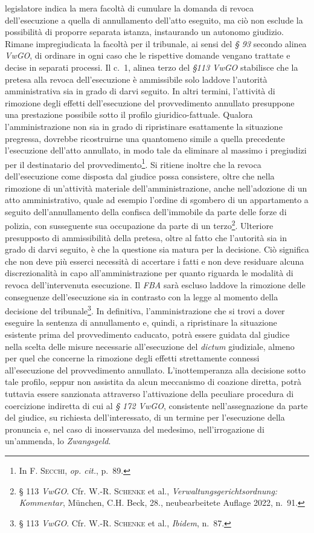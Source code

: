 \documentclass[12pt,it,a4paper,]{report}
\begin{document}
legislatore indica la mera facoltà di cumulare la domanda di revoca
dell'esecuzione a quella di annullamento dell'atto eseguito, ma ciò non
esclude la possibilità di proporre separata istanza, instaurando un
autonomo giudizio. Rimane impregiudicata la facoltà per il tribunale, ai
sensi del \emph{§ 93} secondo alinea \emph{VwGO}, di ordinare in ogni
caso che le rispettive domande vengano trattate e decise in separati
processi. Il c.~1, alinea terzo del \emph{§113 VwGO} stabilisce che la
pretesa alla revoca dell'esecuzione è ammissibile solo laddove
l'autorità amministrativa sia in grado di darvi seguito. In altri
termini, l'attività di rimozione degli effetti dell'esecuzione del
provvedimento annullato presuppone una prestazione possibile sotto il
profilo giuridico-fattuale. Qualora l'amministrazione non sia in grado
di ripristinare esattamente la situazione pregressa, dovrebbe
ricostruirne una quantomeno simile a quella precedente l'esecuzione
dell'atto annullato, in modo tale da eliminare al massimo i pregiudizi
per il destinatario del provvedimento\footnote{In \textsc{F. Secchi},
  \emph{op. cit.}, p.~89.}. Si ritiene inoltre che la revoca
dell'esecuzione come disposta dal giudice possa consistere, oltre che
nella rimozione di un'attività materiale dell'amministrazione, anche
nell'adozione di un atto amministrativo, quale ad esempio l'ordine di
sgombero di un appartamento a seguito dell'annullamento della confisca
dell'immobile da parte delle forze di polizia, con susseguente sua
occupazione da parte di un terzo\footnote{§ 113 \emph{VwGO}. Cfr. W.-R.
  \textsc{Schenke} et al., \emph{Verwaltungsgerichtsordnung: Kommentar},
  München, C.H. Beck, 28., neubearbeitete Auflage 2022, n.~91.}.
Ulteriore presupposto di ammissibilità della pretesa, oltre al fatto che
l'autorità sia in grado di darvi seguito, è che la questione sia matura
per la decisione. Ciò significa che non deve più esserci necessità di
accertare i fatti e non deve residuare alcuna discrezionalità in capo
all'amministrazione per quanto riguarda le modalità di revoca
dell'intervenuta esecuzione. Il \emph{FBA} sarà escluso laddove la
rimozione delle conseguenze dell'esecuzione sia in contrasto con la
legge al momento della decisione del tribunale\footnote{§ 113
  \emph{VwGO}. Cfr. W.-R. \textsc{Schenke} et al., \emph{Ibidem}, n.~87.}.
In definitiva, l'amministrazione che si trovi a dover eseguire la
sentenza di annullamento e, quindi, a ripristinare la situazione
esistente prima del provvedimento caducato, potrà essere guidata dal
giudice nella scelta delle misure necessarie all'esecuzione del
\emph{dictum} giudiziale, almeno per quel che concerne la rimozione
degli effetti strettamente connessi all'esecuzione del provvedimento
annullato. L'inottemperanza alla decisione sotto tale profilo, seppur
non assistita da alcun meccanismo di coazione diretta, potrà tuttavia
essere sanzionata attraverso l'attivazione della peculiare procedura di
coercizione indiretta di cui al \emph{§ 172 VwGO}, consistente
nell'assegnazione da parte del giudice, su richiesta dell'interessato,
di un termine per l'esecuzione della pronuncia e, nel caso di
inosservanza del medesimo, nell'irrogazione di un'ammenda, lo
\emph{Zwangsgeld}.
\end{document}
